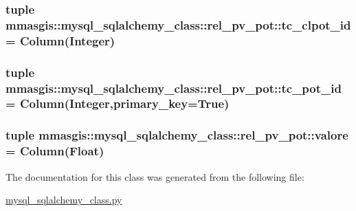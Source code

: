 \label{classmmasgis_1_1mysql__sqlalchemy__class_1_1rel__pv__pot_abb705238ad6888bf82c48a7b82d1d982}
\hypertarget{classmmasgis_1_1mysql__sqlalchemy__class_1_1rel__pv__pot_a4737fa1fb74933832dc3c8bf2eebd6d5}{
\subsubsection[{tc\_\-clpot\_\-id}]{\setlength{\rightskip}{0pt plus 5cm}tuple {\bf mmasgis::mysql\_\-sqlalchemy\_\-class::rel\_\-pv\_\-pot::tc\_\-clpot\_\-id} = Column(Integer)}}
\label{classmmasgis_1_1mysql__sqlalchemy__class_1_1rel__pv__pot_a4737fa1fb74933832dc3c8bf2eebd6d5}
\hypertarget{classmmasgis_1_1mysql__sqlalchemy__class_1_1rel__pv__pot_a456dd348158aae49113df29aeedb5201}{
\subsubsection[{tc\_\-pot\_\-id}]{\setlength{\rightskip}{0pt plus 5cm}tuple {\bf mmasgis::mysql\_\-sqlalchemy\_\-class::rel\_\-pv\_\-pot::tc\_\-pot\_\-id} = Column(Integer,primary\_\-key=True)}}
\label{classmmasgis_1_1mysql__sqlalchemy__class_1_1rel__pv__pot_a456dd348158aae49113df29aeedb5201}
\hypertarget{classmmasgis_1_1mysql__sqlalchemy__class_1_1rel__pv__pot_a0352813c696bd8238c89a666ac741420}{
\subsubsection[{valore}]{\setlength{\rightskip}{0pt plus 5cm}tuple {\bf mmasgis::mysql\_\-sqlalchemy\_\-class::rel\_\-pv\_\-pot::valore} = Column(Float)}}
\label{classmmasgis_1_1mysql__sqlalchemy__class_1_1rel__pv__pot_a0352813c696bd8238c89a666ac741420}


The documentation for this class was generated from the following file:\begin{DoxyCompactItemize}
\item 
\hyperlink{mysql__sqlalchemy__class_8py}{mysql\_\-sqlalchemy\_\-class.py}\end{DoxyCompactItemize}
